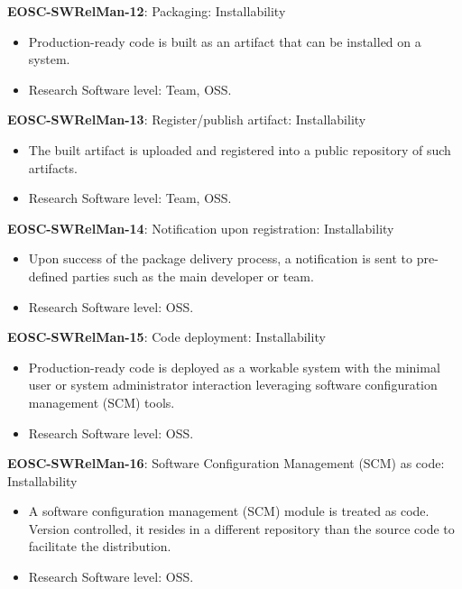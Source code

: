 \textbf{EOSC-SWRelMan-12}: Packaging: Installability

\begin{itemize}
    \item Production-ready code is  built as an artifact that can be installed on a system. \cite{shepherdson_cessda_2019,orviz_set_2017,raymond_software_2013}
    \item Research Software level: Team, OSS.
\end{itemize}

\textbf{EOSC-SWRelMan-13}: Register/publish artifact: Installability

\begin{itemize}
    \item The built artifact is uploaded and registered into a public repository of such artifacts. \cite{orviz_set_2017}
    \item Research Software level: Team, OSS.
\end{itemize}

\textbf{EOSC-SWRelMan-14}: Notification upon registration: Installability

\begin{itemize}
    \item Upon success of the package delivery process, a notification is sent to pre-defined parties such as the main developer or team. \cite{orviz_set_2017}
    \item Research Software level: OSS.
\end{itemize}

\textbf{EOSC-SWRelMan-15}: Code deployment: Installability

\begin{itemize}
    \item Production-ready code is deployed as a workable system with the minimal user or system administrator interaction leveraging software configuration management (SCM) tools. \cite{orviz_set_2017}
    \item Research Software level: OSS.
\end{itemize}

\textbf{EOSC-SWRelMan-16}: Software Configuration Management (SCM) as code: Installability

\begin{itemize}
    \item A software configuration management (SCM) module is treated as code. Version controlled, it resides in a different repository than the source code to facilitate the distribution. \cite{orviz_set_2017}
    \item Research Software level: OSS.
\end{itemize}

